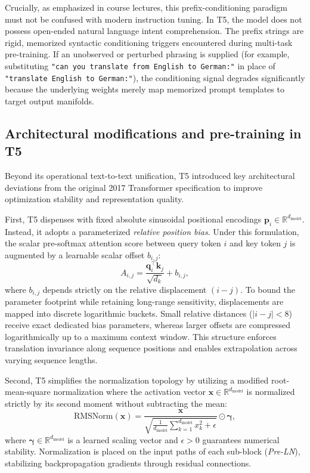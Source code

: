\documentclass[../../main.tex]{subfiles}
\begin{document}
Crucially, as emphasized in course lectures, this prefix-conditioning paradigm must not be confused with modern instruction tuning. In T5, the model does not possess open-ended natural language intent comprehension. The prefix strings are rigid, memorized syntactic conditioning triggers encountered during multi-task pre-training. If an unobserved or perturbed phrasing is supplied (for example, substituting \texttt{"can you translate from English to German:"} in place of \texttt{"translate English to German:"}), the conditioning signal degrades significantly because the underlying weights merely map memorized prompt templates to target output manifolds.


\subsection{Architectural modifications and pre-training in T5}
\label{subsec:t5_mechanics}

Beyond its operational text-to-text unification, T5 introduced key architectural deviations from the original 2017 Transformer specification to improve optimization stability and representation quality.

First, T5 dispenses with fixed absolute sinusoidal positional encodings $\mathbf{p}_i \in \mathbb{R}^{d_{\text{model}}}$. Instead, it adopts a parameterized \emph{relative position bias}. Under this formulation, the scalar pre-softmax attention score between query token $i$ and key token $j$ is augmented by a learnable scalar offset $b_{i,j}$:
\begin{equation}
A_{i,j} = \frac{\mathbf{q}_i^\top \mathbf{k}_j}{\sqrt{d_k}} + b_{i,j},
\label{eq:t5_relative_bias}
\end{equation}
where $b_{i,j}$ depends strictly on the relative displacement $(i - j)$. To bound the parameter footprint while retaining long-range sensitivity, displacements are mapped into discrete logarithmic buckets. Small relative distances ($|i - j| < 8$) receive exact dedicated bias parameters, whereas larger offsets are compressed logarithmically up to a maximum context window. This structure enforces translation invariance along sequence positions and enables extrapolation across varying sequence lengths.

Second, T5 simplifies the normalization topology by utilizing a modified root-mean-square normalization where the activation vector $\mathbf{x} \in \mathbb{R}^{d_{\text{model}}}$ is normalized strictly by its second moment without subtracting the mean:
\begin{equation}
\text{RMSNorm}(\mathbf{x}) = \frac{\mathbf{x}}{\sqrt{\frac{1}{d_{\text{model}}} \sum_{k=1}^{d_{\text{model}}} x_k^2 + \epsilon}} \odot \boldsymbol{\gamma},
\label{eq:t5_rmsnorm}
\end{equation}
where $\boldsymbol{\gamma} \in \mathbb{R}^{d_{\text{model}}}$ is a learned scaling vector and $\epsilon > 0$ guarantees numerical stability. Normalization is placed on the input paths of each sub-block (\emph{Pre-LN}), stabilizing backpropagation gradients through residual connections.
\end{document}
